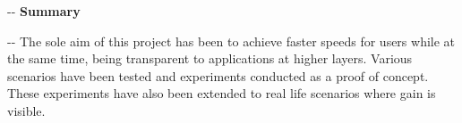 \documentclass[12pt]{article}
\makeatletter
\newenvironment{indentation}[3]%
	{\par\setlength{\parindent}{#3}
	\setlength{\leftmargin}{#1}       \setlength{\rightmargin}{#1}%
	\advance\linewidth -\leftmargin       \advance\linewidth -\rightmargin%
	\advance\@totalleftmargin\leftmargin  \@setpar{{\@@par}}%
	\parshape 1\@totalleftmargin \linewidth\ignorespaces}{\par}%
\makeatother
\begin{document}
\begin{indentation}{0pt}{0pt}{0pt}
\vspace{1cm}
\textbf{{{\Large Summary}}}
\end{indentation}
\vspace{0.5cm}

\begin{indentation}{0pt}{0pt}{0pt}
{\normalsize \hspace{1cm} The sole aim of this project has been to achieve faster speeds for users while at the same time, being transparent to applications at higher layers. Various scenarios have been tested and experiments conducted as a proof of concept. These experiments have also been extended to real life scenarios where gain is visible.}
\end{indentation}
\end{document}
